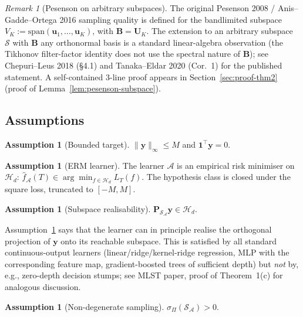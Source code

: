 \documentclass[11pt,a4paper]{article}
\theoremstyle{plain}
\theoremstyle{definition}
\newtheorem{assumption}[theorem]{Assumption}
\theoremstyle{remark}
\newtheorem{remark}[theorem]{Remark}
\newcommand{\by}{\mathbf{y}}
\newcommand{\bP}{\mathbf{P}}
\newcommand{\bB}{\mathbf{B}}
\newcommand{\bU}{\mathbf{U}}
\newcommand{\bu}{\mathbf{u}}
\newcommand{\bone}{\mathbf{1}}
\newcommand{\Scal}{\mathcal{S}}
\newcommand{\Acal}{\mathcal{A}}
\newcommand{\Hcal}{\mathcal{H}}
\begin{document}
\begin{remark}[Pesenson on arbitrary subspaces]
\label{rem:pesenson-extension}
The original Pesenson 2008 / Anis--Gadde--Ortega 2016 sampling quality
is defined for the bandlimited subspace $V_K := \mathrm{span}(\bu_1,
\ldots, \bu_K)$, with $\bB = \bU_K$.  The extension to an arbitrary
subspace $\Scal$ with $\bB$ any orthonormal basis is a standard
linear-algebra observation (the Tikhonov filter-factor identity does
not use the spectral nature of $\bB$); see
Chepuri--Leus 2018 (\S 4.1) and Tanaka--Eldar 2020 (Cor.~1) for the
published statement.  A self-contained 3-line proof appears in
Section~\ref{sec:proof-thm2} (proof of Lemma~\ref{lem:pesenson-subspace}).
\end{remark}

\subsection{Assumptions}

\begin{assumption}[Bounded target]
\label{a:target-bounded}
$\|\by\|_\infty \leq M$ and $\bone^\top \by = 0$.
\end{assumption}

\begin{assumption}[ERM learner]
\label{a:erm}
The learner $\Acal$ is an empirical risk minimiser on $\Hcal_d$:
$\hat f_\Acal(T) \in \arg\min_{f \in \Hcal_d} L_T(f)$.
The hypothesis class is closed under the square loss, truncated to $[-M, M]$.
\end{assumption}

\begin{assumption}[Subspace realisability]
\label{a:realisable}
$\bP_{\Scal_\Acal} \by \in \Hcal_d$.
\end{assumption}

Assumption~\ref{a:realisable} says that the learner can in principle
realise the orthogonal projection of $\by$ onto its reachable subspace.
This is satisfied by all standard continuous-output learners
(linear/ridge/kernel-ridge regression, MLP with the corresponding feature
map, gradient-boosted trees of sufficient depth) but \emph{not} by, e.g.,
zero-depth decision stumps; see MLST paper, proof of Theorem~1(c) for
analogous discussion.

\begin{assumption}[Non-degenerate sampling]
\label{a:sampling}
$\sigma_\Pi(\Scal_\Acal) > 0$.
\end{assumption}
\end{document}
